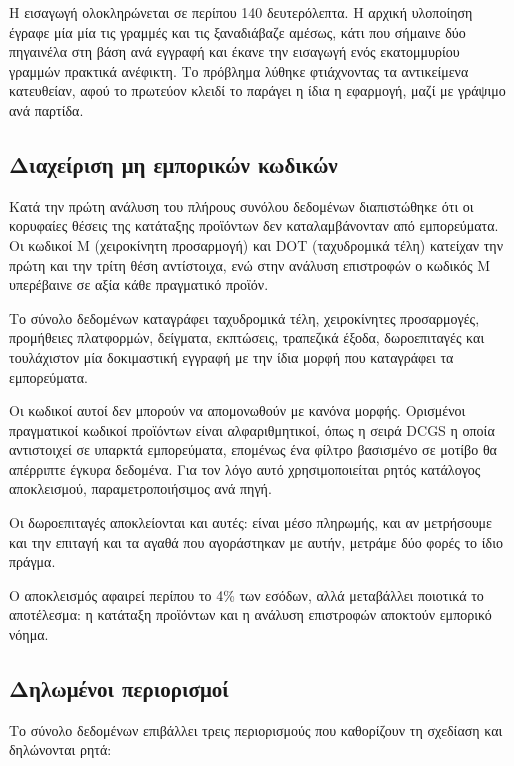 Η εισαγωγή ολοκληρώνεται σε περίπου 140 δευτερόλεπτα. Η αρχική υλοποίηση έγραφε
μία μία τις γραμμές και τις ξαναδιάβαζε αμέσως, κάτι που σήμαινε δύο πηγαινέλα
στη βάση ανά εγγραφή και έκανε την εισαγωγή ενός εκατομμυρίου γραμμών πρακτικά
ανέφικτη. Το πρόβλημα λύθηκε φτιάχνοντας τα αντικείμενα κατευθείαν, αφού το
πρωτεύον κλειδί το παράγει η ίδια η εφαρμογή, μαζί με γράψιμο ανά παρτίδα.

\subsection{Διαχείριση μη εμπορικών κωδικών}
\label{sec:non-product-codes}

Κατά την πρώτη ανάλυση του πλήρους συνόλου δεδομένων διαπιστώθηκε ότι οι
κορυφαίες θέσεις της κατάταξης προϊόντων δεν καταλαμβάνονταν από εμπορεύματα.
Οι κωδικοί \textenglish{M} (χειροκίνητη προσαρμογή) και \textenglish{DOT}
(ταχυδρομικά τέλη) κατείχαν την πρώτη και την τρίτη θέση αντίστοιχα, ενώ στην
ανάλυση επιστροφών ο κωδικός \textenglish{M} υπερέβαινε σε αξία κάθε πραγματικό
προϊόν.

Το σύνολο δεδομένων καταγράφει ταχυδρομικά τέλη, χειροκίνητες προσαρμογές,
προμήθειες πλατφορμών, δείγματα, εκπτώσεις, τραπεζικά έξοδα, δωροεπιταγές και
τουλάχιστον μία δοκιμαστική εγγραφή με την ίδια μορφή που καταγράφει τα
εμπορεύματα.

Οι κωδικοί αυτοί δεν μπορούν να απομονωθούν με κανόνα μορφής. Ορισμένοι
πραγματικοί κωδικοί προϊόντων είναι αλφαριθμητικοί, όπως η σειρά
\textenglish{DCGS} η οποία αντιστοιχεί σε υπαρκτά εμπορεύματα, επομένως ένα
φίλτρο βασισμένο σε μοτίβο θα απέρριπτε έγκυρα δεδομένα. Για τον λόγο αυτό
χρησιμοποιείται ρητός κατάλογος αποκλεισμού, παραμετροποιήσιμος ανά πηγή.

Οι δωροεπιταγές αποκλείονται και αυτές: είναι μέσο πληρωμής, και αν μετρήσουμε
και την επιταγή και τα αγαθά που αγοράστηκαν με αυτήν, μετράμε δύο φορές το ίδιο
πράγμα.

Ο αποκλεισμός αφαιρεί περίπου το 4\% των εσόδων, αλλά μεταβάλλει ποιοτικά το
αποτέλεσμα: η κατάταξη προϊόντων και η ανάλυση επιστροφών αποκτούν εμπορικό
νόημα.

\subsection{Δηλωμένοι περιορισμοί}

Το σύνολο δεδομένων επιβάλλει τρεις περιορισμούς που καθορίζουν τη σχεδίαση και
δηλώνονται ρητά:

